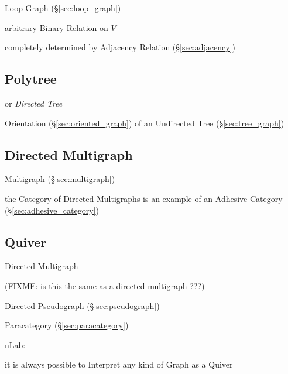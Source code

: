 Loop Graph (\S\ref{sec:loop_graph})

arbitrary Binary Relation on $V$

completely determined by Adjacency Relation (\S\ref{sec:adjacency})



\subsection{Polytree}\label{sec:polytree}

or \emph{Directed Tree}

Orientation (\S\ref{sec:oriented_graph}) of an Undirected Tree
(\S\ref{sec:tree_graph})



\subsection{Directed Multigraph}\label{sec:directed_multigraph}

Multigraph (\S\ref{sec:multigraph})

the Category of Directed Multigraphs is an example of an Adhesive Category
(\S\ref{sec:adhesive_category})



\subsection{Quiver}\label{sec:quiver}

Directed Multigraph

(FIXME: is this the same as a directed multigraph ???)

Directed Pseudograph (\S\ref{sec:pseudograph})

Paracategory (\S\ref{sec:paracategory})

nLab:

it is always possible to Interpret any kind of Graph as a Quiver



